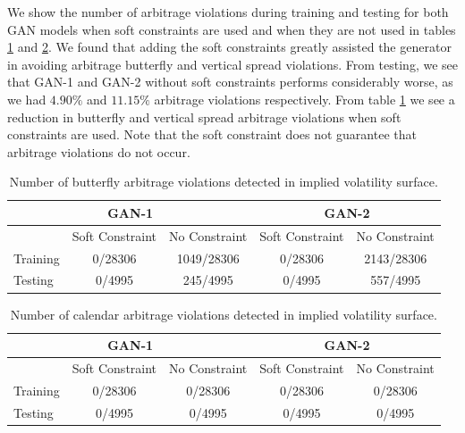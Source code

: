 \documentclass{article}
\theoremstyle{plain}%
\theoremstyle{definition}
\theoremstyle{remark}
\begin{document}
We show the number of arbitrage violations during training and testing for both GAN models when soft constraints are used and when they are not used in tables \ref{tab:butterfly_arbitrage_violations} and \ref{tab:calendar_arbitrage_violations}. We found that adding the soft constraints greatly assisted the generator in avoiding arbitrage butterfly and vertical spread violations. From testing, we see that GAN-1 and GAN-2 without soft constraints performs considerably worse, as we had $4.90\%$ and $11.15\%$ arbitrage violations respectively. From table \ref{tab:butterfly_arbitrage_violations} we see a reduction in butterfly and vertical spread arbitrage violations when soft constraints are used. Note that the soft constraint does not guarantee that arbitrage violations do not occur.
\begin{table}[htbp]
\centering
\caption{Number of butterfly arbitrage violations detected in implied volatility surface.}
\begin{tabular}{lcccc}
\hline
\multicolumn{3}{c}{\textbf{GAN-1}} & \multicolumn{2}{c}{\textbf{GAN-2}} \\
\hline
& Soft Constraint & No Constraint & Soft Constraint & No Constraint \\
\hline
Training & 0/28306 & 1049/28306 & 0/28306 & 2143/28306 \\
Testing & 0/4995 & 245/4995 & 0/4995 & 557/4995 \\
\hline
\end{tabular}
\label{tab:butterfly_arbitrage_violations}
\end{table}

\begin{table}[htbp]
\centering
\caption{Number of calendar arbitrage violations detected in implied volatility surface.}
\begin{tabular}{lcccc}
\hline
\multicolumn{3}{c}{\textbf{GAN-1}} & \multicolumn{2}{c}{\textbf{GAN-2}} \\
\hline
& Soft Constraint & No Constraint & Soft Constraint & No Constraint \\
\hline
Training & 0/28306 & 0/28306 & 0/28306 & 0/28306 \\
Testing & 0/4995 & 0/4995 & 0/4995 & 0/4995 \\
\hline
\end{tabular}
\label{tab:calendar_arbitrage_violations}
\end{table}
\end{document}
